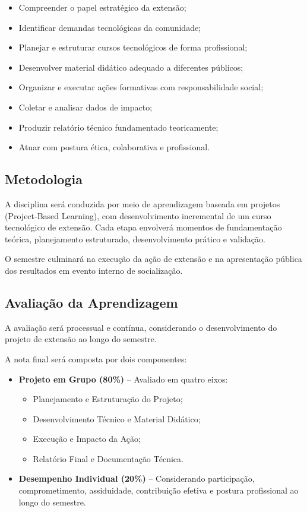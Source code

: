 \documentclass[12pt,a4paper]{article}
\begin{document}
\begin{itemize}
    \item Compreender o papel estratégico da extensão;
    \item Identificar demandas tecnológicas da comunidade;
    \item Planejar e estruturar cursos tecnológicos de forma profissional;
    \item Desenvolver material didático adequado a diferentes públicos;
    \item Organizar e executar ações formativas com responsabilidade social;
    \item Coletar e analisar dados de impacto;
    \item Produzir relatório técnico fundamentado teoricamente;
    \item Atuar com postura ética, colaborativa e profissional.
\end{itemize}

\subsection*{Metodologia}

A disciplina será conduzida por meio de aprendizagem baseada em projetos (Project-Based Learning), com desenvolvimento incremental de um curso tecnológico de extensão. Cada etapa envolverá momentos de fundamentação teórica, planejamento estruturado, desenvolvimento prático e validação.

O semestre culminará na execução da ação de extensão e na apresentação pública dos resultados em evento interno de socialização.



\subsection*{Avaliação da Aprendizagem}

A avaliação será processual e contínua, considerando o desenvolvimento do projeto de extensão ao longo do semestre.

A nota final será composta por dois componentes:

\begin{itemize}
    \item \textbf{Projeto em Grupo (80\%)} – Avaliado em quatro eixos:
    \begin{itemize}
        \item Planejamento e Estruturação do Projeto;
        \item Desenvolvimento Técnico e Material Didático;
        \item Execução e Impacto da Ação;
        \item Relatório Final e Documentação Técnica.
    \end{itemize}
    
    \item \textbf{Desempenho Individual (20\%)} – Considerando participação, comprometimento, assiduidade, contribuição efetiva e postura profissional ao longo do semestre.
\end{itemize}
\end{document}
